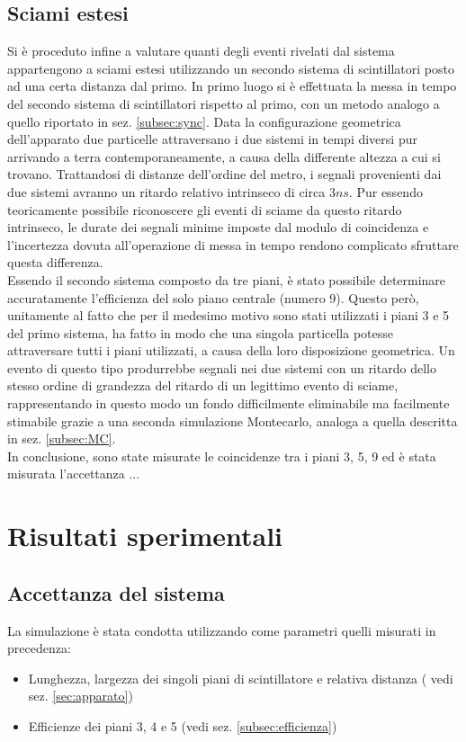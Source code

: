 \documentclass[11pt]{article}
\begin{document}
\subsection{Sciami estesi}
Si è proceduto infine a valutare quanti degli eventi rivelati dal sistema appartengono a sciami estesi utilizzando un secondo sistema di scintillatori posto ad una certa distanza dal primo. In primo luogo si è effettuata la messa in tempo del secondo sistema di scintillatori rispetto al primo, con un metodo analogo a quello riportato in sez. \ref{subsec:sync}. Data la configurazione geometrica dell'apparato due particelle attraversano i due sistemi in tempi diversi pur arrivando a terra contemporaneamente, a causa della differente altezza a cui si trovano. Trattandosi di distanze dell'ordine del metro, i segnali provenienti dai due sistemi avranno un ritardo relativo intrinseco di circa $3 ns$. Pur essendo teoricamente possibile riconoscere gli eventi di sciame da questo ritardo intrinseco, le durate dei segnali minime imposte dal modulo di coincidenza e l'incertezza dovuta all'operazione di messa in tempo rendono complicato sfruttare questa differenza. \\
Essendo il secondo sistema composto da tre piani, è stato possibile determinare accuratamente l'efficienza del solo piano centrale (numero 9). Questo però, unitamente al fatto che per il medesimo motivo sono stati utilizzati i piani 3 e 5 del primo sistema, ha fatto in modo che una singola particella potesse attraversare tutti i piani utilizzati, a causa della loro disposizione geometrica. Un evento di questo tipo produrrebbe segnali nei due sistemi con un ritardo dello stesso ordine di grandezza del ritardo di un legittimo evento di sciame, rappresentando in questo modo un fondo difficilmente eliminabile ma facilmente stimabile grazie a una seconda simulazione Montecarlo, analoga a quella descritta in sez. \ref{subsec:MC}. \\
In conclusione, sono state misurate le coincidenze tra i piani 3, 5, 9 ed è stata misurata l'accettanza ...

\section{Risultati sperimentali}
\subsection{Accettanza del sistema}
La simulazione è stata condotta utilizzando come parametri quelli misurati in precedenza:
\begin{itemize}
\item{Lunghezza, largezza dei singoli piani di scintillatore e relativa distanza (
vedi sez. \ref{sec:apparato}})
\item{Efficienze dei piani 3, 4 e 5 (vedi sez. \ref{subsec:efficienza})}
\end{itemize}
\end{document}
